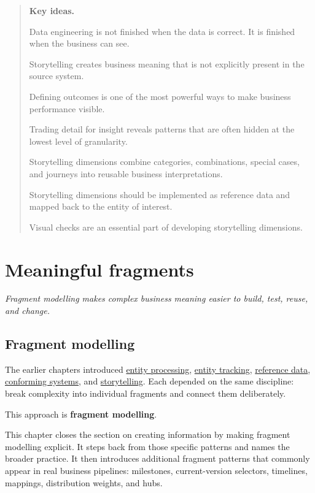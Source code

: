 \documentclass[10pt,openany,10pt]{book}
\begin{document}
\begin{quote}
\textbf{Key ideas.}

Data engineering is not finished when the data is correct. It is
finished when the business can see.

Storytelling creates business meaning that is not explicitly present in
the source system.

Defining outcomes is one of the most powerful ways to make business
performance visible.

Trading detail for insight reveals patterns that are often hidden at the
lowest level of granularity.

Storytelling dimensions combine categories, combinations, special cases,
and journeys into reusable business interpretations.

Storytelling dimensions should be implemented as reference data and
mapped back to the entity of interest.

Visual checks are an essential part of developing storytelling
dimensions.
\end{quote}

\newpage

\chapter{Meaningful
fragments}\label{docs-creating-information-meaningful-fragments}

\emph{Fragment modelling makes complex business meaning easier to build,
test, reuse, and change.}

\section{Fragment modelling}\label{fragment-modelling-1}

The earlier chapters introduced
\hyperref[docs-creating-information-entity-processing]{entity
processing}, \hyperref[docs-creating-information-entity-tracking]{entity
tracking}, \hyperref[docs-creating-information-reference-data]{reference
data},
\hyperref[docs-creating-information-conforming-systems]{conforming
systems}, and
\hyperref[docs-creating-information-storytelling]{storytelling}. Each
depended on the same discipline: break complexity into individual
fragments and connect them deliberately.

This approach is \textbf{fragment modelling}.

This chapter closes the section on creating information by making
fragment modelling explicit. It steps back from those specific patterns
and names the broader practice. It then introduces additional fragment
patterns that commonly appear in real business pipelines: milestones,
current-version selectors, timelines, mappings, distribution weights,
and hubs.
\end{document}
